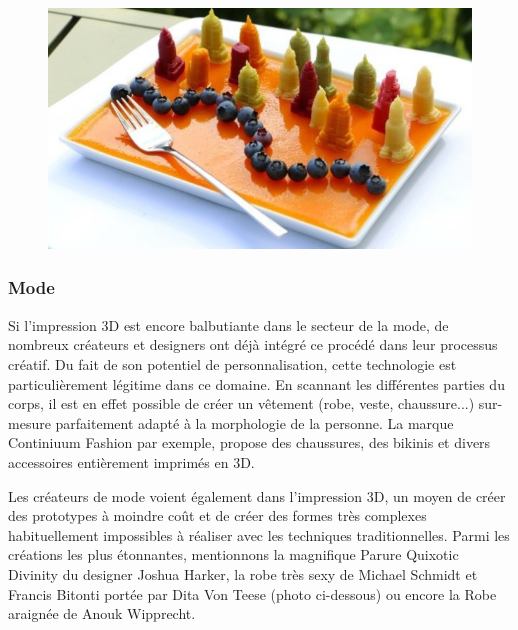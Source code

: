 \documentclass{article}
\begin{document}
\begin{figure}[h!]
\centering
\includegraphics[scale=0.4]{./images/alimentation.png}
\end{figure}\hfill

\subsubsection{Mode}

Si l'impression 3D est encore balbutiante dans le secteur de la mode, de nombreux créateurs et designers ont déjà intégré ce procédé dans leur processus créatif. Du fait de son potentiel de personnalisation, cette technologie est particulièrement légitime dans ce domaine. En scannant les différentes parties du corps, il est en effet possible de créer un vêtement (robe, veste, chaussure...) sur-mesure parfaitement adapté à la morphologie de la personne. La marque Continiuum Fashion par exemple, propose des chaussures, des bikinis et divers accessoires entièrement imprimés en 3D.\hfill
 \par\leavevmode\par
Les créateurs de mode voient également dans l'impression 3D, un moyen de créer des prototypes à moindre coût et de créer des formes très complexes habituellement impossibles à réaliser avec les techniques traditionnelles. Parmi les créations les plus étonnantes, mentionnons la magnifique Parure Quixotic Divinity du designer Joshua Harker, la robe très sexy de Michael Schmidt et Francis Bitonti portée par Dita Von Teese (photo ci-dessous) ou encore la Robe araignée de Anouk Wipprecht.
\end{document}
